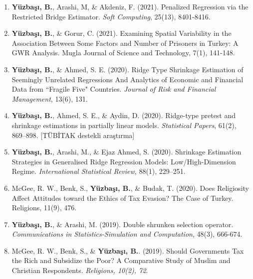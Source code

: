 \documentclass[10pt,a4paper]{article}
\newenvironment{etaremune}{\begin{enumerate}}{\end{enumerate}}
\newcommand{\JournalInfo}[2]{\hspace{0.3em}{\small\textsf{[#1; #2]}}}
\newcommand{\TubitakOutput}{{\small\textsf{[TÜBİTAK destekli araştırma]}}}
\begin{document}
\begin{etaremune}
\item  {\bf Y\"{u}zba\c{s}{\i}, B.}, Arashi, M, \& Akdeniz, F. (2021). Penalized Regression via the Restricted Bridge Estimator. {\em Soft Computing}, 25(13), 8401-8416. \JournalInfo{SCIE}{Q3}


\item  {\bf Y\"{u}zba\c{s}{\i}, B.}, \& Gorur, C. (2021). Examining Spatial Variability in the Association Between Some Factors and Number of Prisoners in Turkey: A GWR Analysis. Mugla Journal of Science and Technology, 7(1), 141-148.


\item  {\bf Y\"{u}zba\c{s}{\i}, B.}, \& Ahmed, S. E. (2020). Ridge Type Shrinkage Estimation of Seemingly Unrelated Regressions And Analytics of Economic and Financial Data from ``Fragile Five" Countries. {\em Journal of Risk and Financial Management}, 13(6), 131. 

\item  {\bf Y\"{u}zba\c{s}{\i}, B.}, Ahmed, S. E., \& Aydin, D. (2020). Ridge-type pretest and shrinkage estimations in partially linear models. {\em Statistical Papers}, 61(2), 869--898. \JournalInfo{SCIE}{Q2; WoS/JCR 2025} \TubitakOutput
\label{stat_paper}

\item  {\bf Y\"{u}zba\c{s}{\i}, B.}, Arashi, M., \& Ejaz Ahmed, S. (2020). Shrinkage Estimation Strategies in Generalised Ridge Regression Models: Low/High-Dimension Regime. {\em International Statistical Review}, 88(1), 229--251. \JournalInfo{SCIE}{Q1}
\label{int_stat_paper}

\item McGee, R. W., Benk, S., {\bf Y\"{u}zba\c{s}{\i}, B.}, \& Budak, T. (2020). Does Religiosity Affect Attitudes toward the Ethics of Tax Evasion? The Case of Turkey. Religions, 11(9), 476. \JournalInfo{AHCI}{Q1}
\label{robert1_paper}


\item {\bf Y\"{u}zba\c{s}{\i}, B.},  \& Arashi, M. (2019). Double shrunken selection operator. {\em Communications in Statistics-Simulation and Computation}, 48(3), 666-674. \JournalInfo{SCIE}{Q3}

\item
McGee, R. W., Benk, S., \&  {\bf Y\"{u}zba\c{s}{\i}, B.}. (2019). Should Governments Tax the Rich and Subsidize the Poor? A Comparative Study of Muslim and Christian Respondents. {\em Religions, 10(2), 72}. \JournalInfo{AHCI}{Q1}
\label{robert2_paper}





\end{etaremune}
\end{document}
